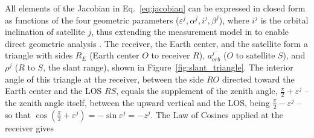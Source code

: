 \documentclass[letterpaper,times]{IONconf-v2}
\theoremstyle{plain}
\theoremstyle{remark}
\begin{document}
All elements of the Jacobian in Eq.~\eqref{eq:jacobian} can be expressed in closed form as functions of the four geometric parameters ($\varepsilon^j,\alpha^j,i^j,\beta^j$), where $i^j$ is the orbital inclination of satellite $j$, thus extending the measurement model in \textcite{Psiaki2021} to enable direct geometric analysis \parencite[see also][for exact analytical differentiation of the high-fidelity Doppler Jacobian]{Baron2024}. The receiver, the Earth center, and the satellite form a triangle with sides $R_E$ (Earth center $O$ to receiver $R$), $a_{orb}^j$ ($O$ to satellite $S$), and $\rho^j$ ($R$ to $S$, the slant range), shown in Figure~\ref{fig:slant_triangle}. The interior angle of this triangle at the receiver, between the side $RO$ directed toward the Earth center and the LOS $RS$, equals the supplement of the zenith angle, $\tfrac{\pi}{2}+\varepsilon^j$ -- the zenith angle itself, between the upward vertical and the LOS, being $\tfrac{\pi}{2}-\varepsilon^j$ -- so that $\cos\!\left(\tfrac{\pi}{2}+\varepsilon^j\right) = -\sin\varepsilon^j = -z^j$. The Law of Cosines applied at the receiver gives
%
\vspace{-10pt}
%
\end{document}
